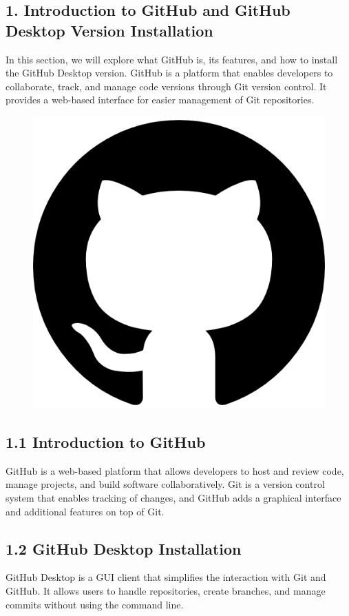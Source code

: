 \documentclass[a4paper,12pt]{article}
\begin{document}
\newpage

\subsection*{1. Introduction to GitHub and GitHub Desktop Version Installation}


In this section, we will explore what GitHub is, its features, and how to install the GitHub Desktop version. 
GitHub is a platform that enables developers to collaborate, track, and manage code versions through Git version control. 
It provides a web-based interface for easier management of Git repositories. 
\vspace{0.1 cm}
\begin{figure}[h!]
   \centering
    \includegraphics[width=0.5\linewidth]{github logo.png}
\end{figure}
\vspace{0.5 cm}

\subsection*{1.1 Introduction to GitHub}
GitHub is a web-based platform that allows developers to host and review code, manage projects, and build software collaboratively. 
Git is a version control system that enables tracking of changes, and GitHub adds a graphical interface and additional features on top of Git.

\subsection*{1.2 GitHub Desktop Installation}
GitHub Desktop is a GUI client that simplifies the interaction with Git and GitHub. 
It allows users to handle repositories, create branches, and manage commits without using the command line.
\\
\\
\end{document}
